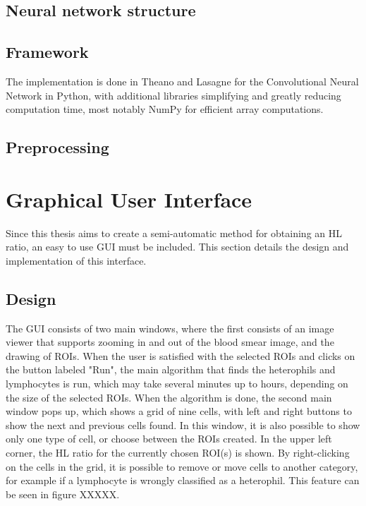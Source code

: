 \subsection{Neural network structure}\label{sec:research:history}

\subsection{Framework}\label{sec:research:history}
The implementation is done in Theano and Lasagne for the Convolutional Neural Network in Python, with additional libraries simplifying and greatly reducing computation time, most notably NumPy for efficient array computations. 

\subsection{Preprocessing}\label{sec:research:history}

\section{Graphical User Interface}
Since this thesis aims to create a semi-automatic method for obtaining an HL ratio, an easy to use GUI must be included. This section details the design and implementation of this interface.

\subsection{Design}
The GUI consists of two main windows, where the first consists of an image viewer that supports zooming in and out of the blood smear image, and the drawing of ROIs. When the user is satisfied with the selected ROIs and clicks on the button labeled "Run", the main algorithm that finds the heterophils and lymphocytes is run, which may take several minutes up to hours, depending on the size of the selected ROIs. When the algorithm is done, the second main window pops up, which shows a grid of nine cells, with left and right buttons to show the next and previous cells found. In this window, it is also possible to show only one type of cell, or choose between the ROIs created. In the upper left corner, the HL ratio for the currently chosen ROI(s) is shown. By right-clicking on the cells in the grid, it is possible to remove or move cells to another category, for example if a lymphocyte is wrongly classified as a heterophil. This feature can be seen in figure XXXXX.

